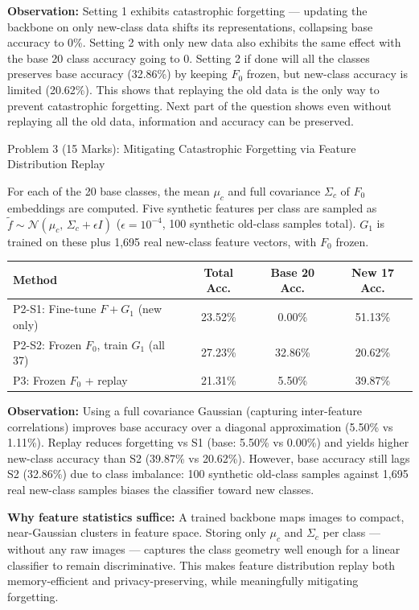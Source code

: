 \documentclass[11pt,a4paper,onecolumn]{exam}
\newcommand{\questionheader}[1]{%
  \begin{tcolorbox}[
    enhanced,
    colback=black,
    coltext=white,
    boxrule=0pt,
    fontupper=\bfseries,
    arc=3mm,
    top=1.5pt, bottom=1.5pt
  ]
  #1
  \end{tcolorbox}%
}
\begin{document}
\vspace{1pt}
\noindent\textbf{Observation:} Setting 1 exhibits catastrophic forgetting — updating the backbone on only new-class data shifts its representations, collapsing base accuracy to 0\%. Setting 2 with only new data also exhibits the same effect with the base 20 class accuracy going to 0. Setting 2 if done will all the classes preserves base accuracy (32.86\%) by keeping $F_0$ frozen, but new-class accuracy is limited (20.62\%). This shows that replaying the old data is the only way to prevent catastrophic forgetting. Next part of the question shows even without replaying all the old data, information and accuracy can be preserved.

\questionheader{Problem 3 (15 Marks): Mitigating Catastrophic Forgetting via Feature Distribution Replay}

\noindent For each of the 20 base classes, the mean $\mu_c$ and full covariance $\Sigma_c$ of $F_0$ embeddings are computed. Five synthetic features per class are sampled as $\tilde{f} \sim \mathcal{N}(\mu_c,\,\Sigma_c + \epsilon I)$ ($\epsilon=10^{-4}$, 100 synthetic old-class samples total). $G_1$ is trained on these plus 1,695 real new-class feature vectors, with $F_0$ frozen.

\vspace{2pt}
\begin{center}
\begin{tabular}{lccc}
\toprule
\textbf{Method} & \textbf{Total Acc.} & \textbf{Base 20 Acc.} & \textbf{New 17 Acc.} \\
\midrule
P2-S1: Fine-tune $F+G_1$ (new only)        & 23.52\% & 0.00\%  & 51.13\% \\
P2-S2: Frozen $F_0$, train $G_1$ (all 37)  & 27.23\% & 32.86\% & 20.62\% \\
P3:\phantom{-S2} Frozen $F_0$ + replay     & 21.31\% & 5.50\%  & 39.87\% \\
\bottomrule
\end{tabular}
\end{center}

\vspace{1pt}
\noindent\textbf{Observation:} Using a full covariance Gaussian (capturing inter-feature correlations) improves base accuracy over a diagonal approximation (5.50\% vs 1.11\%). Replay reduces forgetting vs S1 (base: 5.50\% vs 0.00\%) and yields higher new-class accuracy than S2 (39.87\% vs 20.62\%). However, base accuracy still lags S2 (32.86\%) due to class imbalance: 100 synthetic old-class samples against 1,695 real new-class samples biases the classifier toward new classes.

\noindent\textbf{Why feature statistics suffice:} A trained backbone maps images to compact, near-Gaussian clusters in feature space. Storing only $\mu_c$ and $\Sigma_c$ per class — without any raw images — captures the class geometry well enough for a linear classifier to remain discriminative. This makes feature distribution replay both memory-efficient and privacy-preserving, while meaningfully mitigating forgetting.
\end{document}
